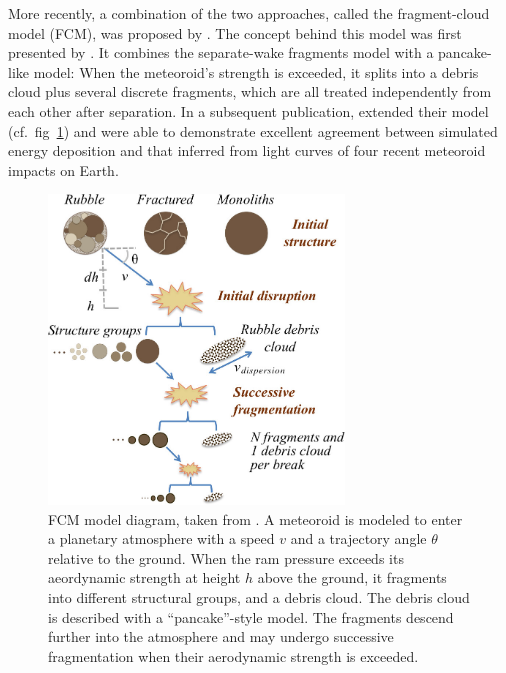 More recently, a combination of the two approaches, called the fragment-cloud model (FCM), was proposed by \cite{wheeler2017fragmentcloud}.
The concept behind this model was first presented by \cite{mehta2015break}.
It combines the separate-wake fragments model \citep{passey1980effects,artemieva1996interaction} with a pancake-like model:
When the meteoroid's strength is exceeded, it splits into a debris cloud plus several discrete fragments, which are all treated independently from each other after separation.
In a subsequent publication, \cite{wheeler2018atmospheric} extended their model (cf.~fig~\ref{fig:FCMv2}) and were able to demonstrate excellent agreement between simulated energy deposition and that inferred from light curves of four recent meteoroid impacts on Earth.

\begin{figure}[htbp]
    \centering
    \includegraphics[width=0.7\textwidth]{figures/wheeler_diagram.jpg}
    \caption{FCM model diagram, taken from \cite{wheeler2018atmospheric}.
        A meteoroid is modeled to enter a planetary atmosphere with a speed $v$ and a trajectory angle $\theta$ relative to the ground. When the ram pressure exceeds its aeordynamic strength at height $h$ above the ground, it fragments into different structural groups, and a debris cloud. The debris cloud is described with a ``pancake''-style model. The fragments descend further into the atmosphere and may undergo successive fragmentation when their aerodynamic strength is exceeded.\label{fig:FCMv2}}
\end{figure}

